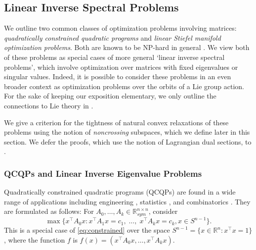 \documentclass{article}
\numberwithin{equation}{section}
\newcommand{\R}{\mathbb{R}}
\begin{document}
\subsection{Linear Inverse Spectral Problems}
\label{sec:matrix_optimization}
We outline two common classes of optimization problems involving matrices: \emph{quadratically constrained quadratic programs} and \emph{linear Stiefel manifold optimization problems}. Both are known to be NP-hard in general \cite{song2024linear,ben2001lectures}. We view both of these problems as special cases of more general `linear inverse spectral problems', which involve optimization over matrices with fixed eigenvalues or singular values. Indeed, it is possible to consider these problems in an even broader context as optimization problems over the orbits of a Lie group action. For the sake of keeping our exposition elementary, we only outline the connections to Lie theory in .

We give a criterion for the tightness of natural convex relaxations of these problems using the notion of \emph{noncrossing} subspaces, which we define later in this section. 
We defer the proofs, which use the notion of Lagrangian dual sections, to  . 

\subsubsection{QCQPs and Linear Inverse Eigenvalue Problems}\label{subsec:QCQP} 


Quadratically constrained quadratic programs (QCQPs) are found in a wide range of applications including engineering \cite{kocuk2016strong}, statistics \cite{candes2015phase}, and combinatorics \cite{gouveia2010theta}.
They are formulated as follows:
For $A_0, \dots, A_k \in \R^{n\times n}_{sym}$, consider
\begin{equation}
    \max \{x^{\intercal} A_0 x : x^{\intercal} A_1 x = c_1, \;\dots,\; x^{\intercal} A_k x = c_k, x \in S^{n-1}\}\label{eq:qcqp}.
    \tag{opt-QCQP}
\end{equation}
This is a special case of \eqref{eq:constrained} over the space $S^{n-1} = \{x \in \R^{n} : x^{\intercal}x = 1\}$, where the function $f$ is $f(x) = (x^{\intercal}A_0x,\dots, x^{\intercal}A_kx)$.
\end{document}
